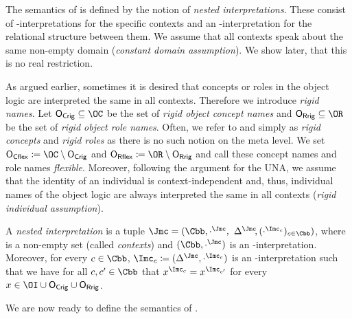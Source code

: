 The semantics of \LMLO is defined by the notion of \emph{nested interpretations}.  These consist of
\Osig-interpretations for the specific contexts and an \Msig-interpretation for the relational
structure between them.  We assume that all contexts speak about the same non-empty domain
(\emph{constant domain assumption}). We show later, that this is no real restriction.

As argued earlier, sometimes it is desired that concepts or roles in the object logic are
interpreted the same in all contexts. Therefore we introduce \emph{rigid names}. Let
$\OCR\subseteq\OC$ be the set of \emph{rigid object concept names} and $\ORR\subseteq\OR$ be the set
of \emph{rigid object role names}.  Often, we refer to \OCR and \ORR simply as \emph{rigid concepts}
and \emph{rigid roles} as there is no such notion on the meta level.  We set
$\OCF\coloneqq\OC\setminus\OCR$ and $\ORF\coloneqq\OR\setminus\ORR$ and call these concept names and
role names \emph{flexible}.  Moreover, following the argument for the UNA, we assume that the
identity of an individual is context-independent and, thus, individual names of the object logic are
always interpreted the same in all contexts (\emph{rigid individual assumption}).

\begin{definition}\label{def:nested-interpretation}
  A \emph{nested interpretation} is a tuple
  $\J=(\Cbb,\cdot^{\J},$ $\Delta^{\J}{\kern-0.2em},(\cdot^{\I_c})_{c\in\Cbb})$, where \Cbb is a
  non-empty set (called \emph{contexts}) and $(\Cbb,\cdot^\J)$ is an \Msig-interpretation.
  Moreover, for every $c\in\Cbb$, $\I_c\coloneqq(\Delta^{\J},\cdot^{\I_c})$ is an
  \Osig-interpretation such that we have for all $c,c'\in\Cbb$ that $x^{\I_{c}}=x^{\I_{c'}}$ for
  every $x\in\OI\cup\OCR\cup\ORR$.
\end{definition}

\noindent
We are now ready to define the semantics of \LMLO.

